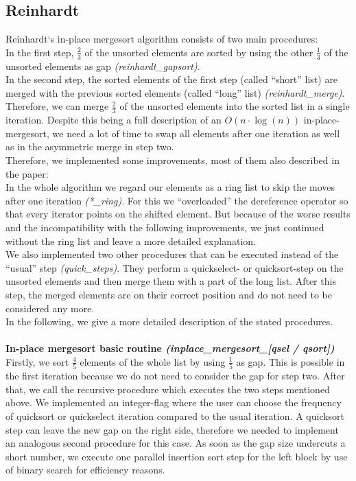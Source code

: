 \documentclass[11pt,pdftex,a4paper, twocolumn]{article}
\begin{document}
\subsection*{Reinhardt}
Reinhardt‘s in-place mergesort algorithm consists of two main procedures: \\
In the first step, $\frac{2}{3}$ of the unsorted elements are sorted by using the other $\frac{1}{3}$ of the unsorted elements as gap \textit{(reinhardt\_gapsort)}. \\
In the second step, the sorted elements of the first step (called “short” list) are merged with the previous sorted elements (called “long” list) \textit{(reinhardt\_merge)}. \\
Therefore, we can merge $\frac{2}{3}$ of the unsorted elements into the sorted list in a single iteration. Despite this being a full description of an $O(n \cdot \log(n))$ in-place-mergesort, we need a lot of time to swap all elements after one iteration as well as in the asymmetric merge in step two. \\
Therefore, we implemented some improvements, most of them also described in the paper: \\
In the whole algorithm we regard our elements as a ring list to skip the moves after one iteration \textit{(*\_ring)}. For this we “overloaded” the dereference operator so that every iterator points on the shifted element. But because of the worse results and the incompatibility with the following improvements, we just continued without the ring list and leave a more detailed explanation. \\
We also implemented two other procedures that can be executed instead of the “usual” step \textit{(quick\_steps)}. They perform a quickselect- or quicksort-step on the unsorted elements and then merge them with a part of the long list. After this step, the merged elements are on their correct position and do not need to be considered any more. \\
In the following, we give a more detailed description of the stated procedures. \\
$ $ \\
\textbf{In-place mergesort basic routine \textit{(inplace\_mergesort\_[qsel / qsort])}} \\
Firstly, we sort $\frac{4}{5}$ elements of the whole list by using $\frac{1}{5}$ as gap. This is possible in the first iteration because we do not need to consider the gap for step two. After that, we call the recursive procedure which executes the two steps mentioned above. We implemented an integer-flag where the user can choose the frequency of quicksort or quickselect iteration compared to the usual iteration. A quicksort step can leave the new gap on the right side, therefore we needed to implement an analogous second procedure for this case. As soon as the gap size undercuts a short number, we execute one parallel insertion sort step for the left block by use of binary search for efficiency reasons. \\
\end{document}
